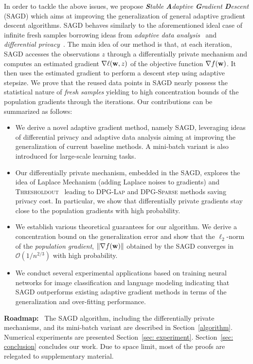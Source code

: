 \documentclass[11pt]{article}
\begin{document}
In order to tackle the above issues, we propose \textit{\textbf{S}table \textbf{A}daptive \textbf{G}radient \textbf{D}escent} (\textsc{SAGD}) which aims at improving the generalization of general adaptive gradient descent algorithms.
\textsc{SAGD} behaves similarly to the aforementioned ideal case of infinite fresh samples borrowing ideas from \emph{adaptive data analysis}~\citep{dwfe2015a} and \emph{differential privacy}~\citep{dwro2014}. 
The main idea of our method is that, at each iteration, \textsc{SAGD} accesses the observations $z$ through a differentially private mechanism and computes an estimated gradient $\nabla \ell(\mathbf{w},z)$ of the objective function $\nabla f(\mathbf{w})$. 
It then uses the estimated gradient to perform a descent step using adaptive stepsize. 
We prove that the reused data points in \textsc{SAGD} nearly possess the statistical nature of \emph{fresh samples} yielding to high concentration bounds of the population gradients through the iterations. Our  contributions  can be summarized as follows:
\begin{itemize}
\item We derive a novel adaptive gradient method, namely \textsc{SAGD}, leveraging ideas of differential privacy and adaptive data analysis aiming at improving the generalization of current baseline methods. A mini-batch variant is also introduced for large-scale learning tasks.
\item Our differentially private mechanism, embedded in the \textsc{SAGD}, explores the idea of Laplace Mechanism (adding Laplace noises to gradients) and \textsc{Thresholdout}~\citep{dwro2014} leading to \textsc{DPG-Lap} and \textsc{DPG-Sparse} methods saving privacy cost. 
In particular, we show that differentially private gradients stay close to the population gradients with high probability. 
\item We establish various theoretical guarantees for our algorithm. We derive a concentration bound on the generalization error and show that the $\ell_2$-norm of the \emph{population gradient}, \ie $\|\nabla f(\mathbf{w})\|$ obtained by the \textsc{SAGD} converges in $\mathcal{O}(1/n^{2/3})$ with high probability. 
\item We conduct several experimental applications based on training neural networks for image classification and language modeling indicating that \textsc{SAGD} outperforms existing adaptive gradient methods in terms of the generalization and over-fitting performance.
\end{itemize}
\textbf{Roadmap:} \ 
The \textsc{SAGD} algorithm, including the differentially private mechanisms, and its mini-batch variant are described in Section~\ref{algorithm}. 
Numerical experiments are presented Section~\ref{sec: experiment}. 
Section~\ref{sec: conclusion} concludes our work. 
Due to space limit, most of the proofs are relegated to supplementary material.
\end{document}

